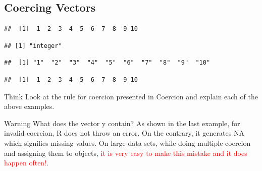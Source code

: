 \subsection{Coercing Vectors}
\begin{knitrout}
\color{fgcolor}\begin{kframe}
\begin{alltt}
\hlkwb{<-}\hlopt{:} 
\end{alltt}
\begin{verbatim}
##  [1]  1  2  3  4  5  6  7  8  9 10
\end{verbatim}
\begin{alltt}
 
\end{alltt}
\begin{verbatim}
## [1] "integer"
\end{verbatim}
\begin{alltt}
 
\end{alltt}
\begin{verbatim}
##  [1] "1"  "2"  "3"  "4"  "5"  "6"  "7"  "8"  "9"  "10"
\end{verbatim}
\begin{alltt}
\hlstd{(} 
\end{alltt}
\begin{verbatim}
##  [1]  1  2  3  4  5  6  7  8  9 10
\end{verbatim}
\begin{alltt}
\hlkwb{<-}\hlstd{(} 
\end{alltt}
\end{kframe}
\end{knitrout}
\begin{DIY}{Think}
Look at the rule for coercion presented in {Coercion} and explain each of the above examples.
\end{DIY}

\begin{DIY}{Warning}
What does the vector y contain? As shown in the last example, for invalid coercion, R does not throw an error. On the contrary, it generates NA which signifies missing values. On large data sets, while doing multiple coercion and assigning them to objects, \textcolor{red}{it is very easy to make this mistake and it does happen often!}.
\end{DIY}

